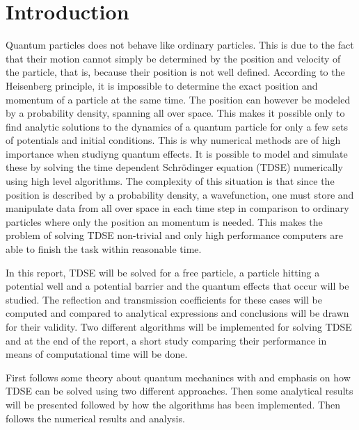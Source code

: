 \section{Introduction}

Quantum particles does not behave like ordinary particles. This is due to the fact that their motion cannot simply be determined by the position and velocity of the particle, that is, because their position is not well defined. According to the Heisenberg principle, it is impossible to determine the exact position and momentum of a particle at the same time. The position can however be modeled by a probability density, spanning all over space. This makes it possible only to find analytic solutions to the dynamics of a quantum particle for only a few sets of potentials and initial conditions. This is why numerical methods are of high importance when studiyng quantum effects. It is possible to model and simulate these by solving the time dependent Schrödinger equation (TDSE) numerically using high level algorithms. The complexity of this situation is that since the position is described by a probability density, a wavefunction, one must store and manipulate data from all over space in each time step in comparison to ordinary particles where only the position an momentum is needed. This makes the problem of solving TDSE non-trivial and only high performance computers are able to finish the task within reasonable time.

In this report, TDSE will be solved for a free particle, a particle hitting a potential well and a potential barrier and the quantum effects that occur will be studied. The reflection and transmission coefficients for these cases will be computed and compared to analytical expressions and conclusions will be drawn for their validity. Two different algorithms will be implemented for solving TDSE and at the end of the report, a short study comparing their performance in means of computational time will be done.

First follows some theory about quantum mechanincs with and emphasis on how TDSE can be solved using two different approaches. Then some analytical results will be presented followed by how the algorithms has been implemented. Then follows the numerical results and analysis.
